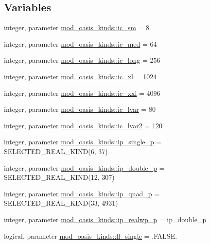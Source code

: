 \subsection*{Variables}
\begin{DoxyCompactItemize}
\item 
integer, parameter \hyperlink{namespacemod__oasis__kinds_a1a914199db5381b8d08453c7cb468a71}{mod\+\_\+oasis\+\_\+kinds\+::ic\+\_\+sm} = 8
\item 
integer, parameter \hyperlink{namespacemod__oasis__kinds_a152059eec479887a8347b0f21d30d600}{mod\+\_\+oasis\+\_\+kinds\+::ic\+\_\+med} = 64
\item 
integer, parameter \hyperlink{namespacemod__oasis__kinds_ada2568a43f71f0f93c054cfd3982da57}{mod\+\_\+oasis\+\_\+kinds\+::ic\+\_\+long} = 256
\item 
integer, parameter \hyperlink{namespacemod__oasis__kinds_a8da8fcfc62bc8c67614f998f57e7e3fc}{mod\+\_\+oasis\+\_\+kinds\+::ic\+\_\+xl} = 1024
\item 
integer, parameter \hyperlink{namespacemod__oasis__kinds_a9e7a6d15a336c2bfdadd42213a73f113}{mod\+\_\+oasis\+\_\+kinds\+::ic\+\_\+xxl} = 4096
\item 
integer, parameter \hyperlink{namespacemod__oasis__kinds_a5c0c2841fb9b4f7cbeb6de3f5731371a}{mod\+\_\+oasis\+\_\+kinds\+::ic\+\_\+lvar} = 80
\item 
integer, parameter \hyperlink{namespacemod__oasis__kinds_abeab7014394cb77b89575d5d93e5f637}{mod\+\_\+oasis\+\_\+kinds\+::ic\+\_\+lvar2} = 120
\item 
integer, parameter \hyperlink{namespacemod__oasis__kinds_a298ab0c96a80ba12ba8969e6bcd186ed}{mod\+\_\+oasis\+\_\+kinds\+::ip\+\_\+single\+\_\+p} = S\+E\+L\+E\+C\+T\+E\+D\+\_\+\+R\+E\+A\+L\+\_\+\+K\+I\+ND(6, 37)
\item 
integer, parameter \hyperlink{namespacemod__oasis__kinds_aff0b6e4604e7a60178eeca47edec1460}{mod\+\_\+oasis\+\_\+kinds\+::ip\+\_\+double\+\_\+p} = S\+E\+L\+E\+C\+T\+E\+D\+\_\+\+R\+E\+A\+L\+\_\+\+K\+I\+ND(12, 307)
\item 
integer, parameter \hyperlink{namespacemod__oasis__kinds_a7889b0425dd055cdc74af6ba9fa1354c}{mod\+\_\+oasis\+\_\+kinds\+::ip\+\_\+quad\+\_\+p} = S\+E\+L\+E\+C\+T\+E\+D\+\_\+\+R\+E\+A\+L\+\_\+\+K\+I\+ND(33, 4931)
\item 
integer, parameter \hyperlink{namespacemod__oasis__kinds_a3875d67b4b579bb15696c55b5547d3c4}{mod\+\_\+oasis\+\_\+kinds\+::ip\+\_\+realwp\+\_\+p} = ip\+\_\+double\+\_\+p
\item 
logical, parameter \hyperlink{namespacemod__oasis__kinds_ae462c851305d5fe6ef6178c9dcac4468}{mod\+\_\+oasis\+\_\+kinds\+::ll\+\_\+single} = .F\+A\+L\+S\+E.

\end{DoxyCompactItemize}
